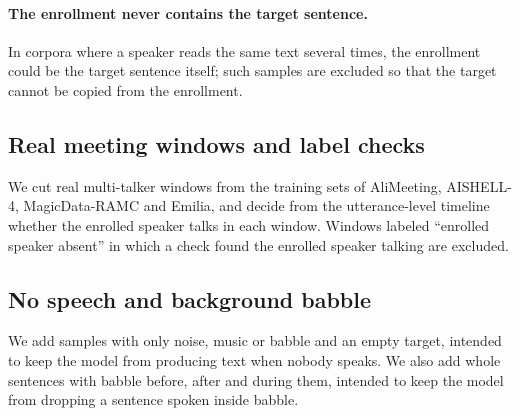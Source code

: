 \paragraph{The enrollment never contains the target sentence.}
In corpora where a speaker reads the same text several times, the enrollment could be the target sentence itself; such samples are excluded so that the target cannot be copied from the enrollment.

\subsection{Real meeting windows and label checks}
\label{subsec:data_real}

We cut real multi-talker windows from the training sets of AliMeeting, AISHELL-4, MagicData-RAMC and Emilia, and decide from the utterance-level timeline whether the enrolled speaker talks in each window.
Windows labeled ``enrolled speaker absent'' in which a check found the enrolled speaker talking are excluded.

\subsection{No speech and background babble}
\label{subsec:data_babble}

We add samples with only noise, music or babble and an empty target, intended to keep the model from producing text when nobody speaks.
We also add whole sentences with babble before, after and during them, intended to keep the model from dropping a sentence spoken inside babble.
